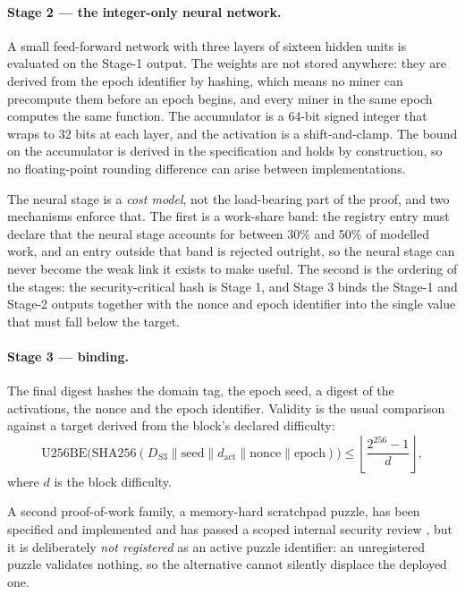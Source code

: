 \documentclass{article}
\begin{document}
\paragraph{Stage 2 --- the integer-only neural network.} A small feed-forward
network with three layers of sixteen hidden units is evaluated on the Stage-1
output. The weights are not stored anywhere: they are derived from the epoch
identifier by hashing, which means no miner can precompute them before an epoch
begins, and every miner in the same epoch computes the same function. The
accumulator is a 64-bit signed integer that wraps to 32 bits at each layer, and
the activation is a shift-and-clamp. The bound on the accumulator is derived in
the specification and holds by construction, so no floating-point rounding
difference can arise between implementations.

The neural stage is a \emph{cost model}, not the load-bearing part of the
proof, and two mechanisms enforce that. The first is a work-share band: the
registry entry must declare that the neural stage accounts for between 30\% and
50\% of modelled work, and an entry outside that band is rejected outright, so
the neural stage can never become the weak link it exists to make useful. The
second is the ordering of the stages: the security-critical hash is Stage 1,
and Stage 3 binds the Stage-1 and Stage-2 outputs together with the nonce and
epoch identifier into the single value that must fall below the target.

\paragraph{Stage 3 --- binding.} The final digest hashes the domain tag, the
epoch seed, a digest of the activations, the nonce and the epoch identifier.
Validity is the usual comparison against a target derived from the block's
declared difficulty:
\begin{equation}
\mathrm{U256BE}\big(\mathrm{SHA256}(D_{S3} \parallel \mathrm{seed} \parallel
d_{\mathrm{act}} \parallel \mathrm{nonce} \parallel \mathrm{epoch})\big)
\leq \left\lfloor \frac{2^{256}-1}{d} \right\rfloor ,
\label{eq:pow}
\end{equation}
where $d$ is the block difficulty.

A second proof-of-work family, a memory-hard scratchpad puzzle, has been
specified and implemented and has passed a scoped internal security review
\cite{srct-hbm-review}, but it is deliberately \emph{not registered} as an
active puzzle identifier: an unregistered puzzle validates nothing, so the
alternative cannot silently displace the deployed one.
\end{document}
